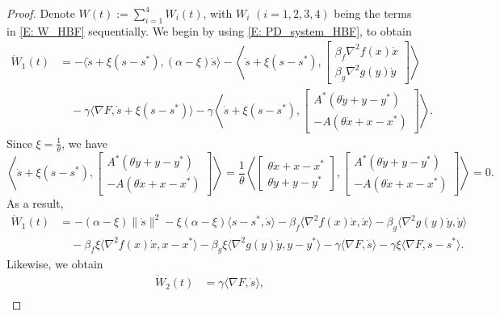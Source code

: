 \documentclass[pdflatex,sn-mathphys-num]{sn-jnl}
\theoremstyle{thmstyleone}
\theoremstyle{thmstyletwo}
\theoremstyle{thmstylethree}
\begin{document}
\begin{proof}
Denote $W(t) := \sum_{i=1}^4 W_i(t)$, with $W_i$ $(i=1,2,3,4)$ being the terms in \eqref{E: W_HBF} sequentially. We begin by using \eqref{E: PD_system_HBF}, to obtain
\begin{align*}
\dot{W}_1(t)
&= -\langle \dot{s} + \xi(s-s^*), (\alpha-\xi)\dot{s} \rangle
   - \left\langle \dot{s} + \xi(s-s^*), \begin{bmatrix}
\beta_f \nabla^2 f(x) \dot{x}\\[2pt]
\beta_g \nabla^2 g(y) \dot{y}
\end{bmatrix} \right\rangle \\
&\quad - \gamma \langle \nabla F, \dot{s} + \xi(s-s^*) \rangle 
 - \gamma \left\langle \dot{s} + \xi(s-s^*), \begin{bmatrix}
A^* ( \theta \dot{y} + y - y^* ) \\[2pt]
- A( \theta\dot{x} + x - x^* )
\end{bmatrix} \right\rangle.
\end{align*}
Since $\xi = \frac{1}{\theta}$, we have
$$ \left\langle \dot{s} + \xi(s-s^*), \begin{bmatrix}
A^* ( \theta \dot{y} + y - y^* ) \\[2pt]
- A( \theta\dot{x} + x - x^* )
\end{bmatrix} \right\rangle 
= \frac{1}{\theta}\left\langle \begin{bmatrix}
\theta\dot{x} + x-x^*\\[2pt]
\theta\dot{y} + y-y^*
\end{bmatrix}, \begin{bmatrix}
A^* ( \theta \dot{y} + y - y^* ) \\[2pt]
- A( \theta\dot{x} + x - x^* )
\end{bmatrix} \right\rangle = 0. $$
As a result,
\begin{align*}
\dot{W}_1 (t)
&= -(\alpha-\xi) \| \dot{s} \|^2 - \xi(\alpha-\xi)\langle s-s^*, \dot{s} \rangle
   -\beta_f \langle \nabla^2 f(x)\dot{x}, \dot{x} \rangle 
   -\beta_g \langle \nabla^2 g(y)\dot{y}, \dot{y} \rangle\\
&\quad - \beta_f \xi \langle \nabla^2 f(x)\dot{x}, x-x^* \rangle
   - \beta_g \xi \langle \nabla^2 g(y)\dot{y}, y-y^* \rangle 
   -\gamma \langle \nabla F, \dot{s} \rangle 
   -\gamma\xi \langle \nabla F, s-s^* \rangle.
\end{align*}
Likewise, we obtain
\begin{align*}
\dot{W}_2(t) &= \gamma \langle \nabla F, \dot{s} \rangle,\\

\end{align*}
\end{proof}
\end{document}
